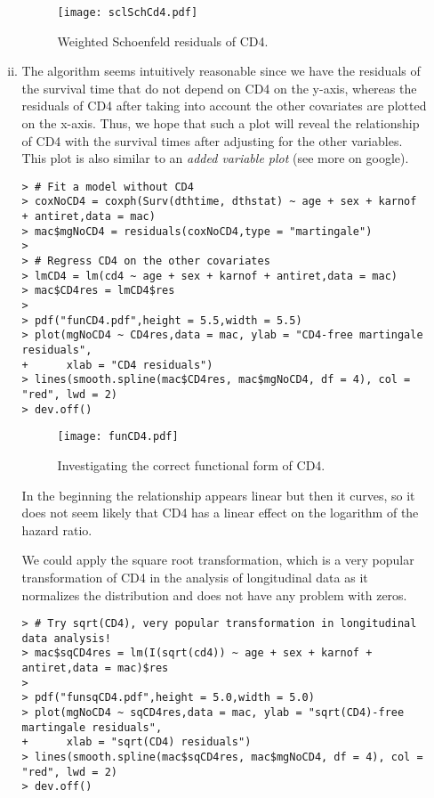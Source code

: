 \begin{enumerate}[(a)]
\begin{enumerate}[(i)]
\begin{figure}
	\centering
		\texttt{[image: sclSchCd4.pdf]}
	\caption{Weighted Schoenfeld residuals of CD4.}
	\label{figure5}
\end{figure}

\item The algorithm seems intuitively reasonable since we have the residuals of the survival time that do not depend on CD4 on the y-axis, whereas the residuals of CD4 after taking into account the other covariates are plotted on the x-axis. Thus, we hope that such a plot will reveal the relationship of CD4 with the survival times after adjusting for the other variables. This plot is also similar to an \emph{added variable plot} (see more on google).
\begin{spacing}{1.2}
\begin{footnotesize}
\begin{verbatim} 
> # Fit a model without CD4
> coxNoCD4 = coxph(Surv(dthtime, dthstat) ~ age + sex + karnof + antiret,data = mac)
> mac$mgNoCD4 = residuals(coxNoCD4,type = "martingale")
> 
> # Regress CD4 on the other covariates
> lmCD4 = lm(cd4 ~ age + sex + karnof + antiret,data = mac)
> mac$CD4res = lmCD4$res
> 
> pdf("funCD4.pdf",height = 5.5,width = 5.5)
> plot(mgNoCD4 ~ CD4res,data = mac, ylab = "CD4-free martingale residuals",
+      xlab = "CD4 residuals")
> lines(smooth.spline(mac$CD4res, mac$mgNoCD4, df = 4), col = "red", lwd = 2)
> dev.off()
\end{verbatim}
\end{footnotesize}
\end{spacing}

\begin{figure}[htbp]
	\centering
		\texttt{[image: funCD4.pdf]}
	\caption{Investigating the correct functional form of CD4.}
	\label{figure6}
\end{figure}
In the beginning the relationship appears linear but then it curves, so it does not seem likely that CD4 has a linear effect on the logarithm of the hazard ratio. 

We could apply the square root transformation, which is a very popular transformation of CD4 in the analysis of longitudinal data as it normalizes the distribution and does not have any problem with zeros. 

\begin{spacing}{1.2}
\begin{footnotesize}
\begin{verbatim} 
> # Try sqrt(CD4), very popular transformation in longitudinal data analysis!
> mac$sqCD4res = lm(I(sqrt(cd4)) ~ age + sex + karnof + antiret,data = mac)$res
> 
> pdf("funsqCD4.pdf",height = 5.0,width = 5.0)
> plot(mgNoCD4 ~ sqCD4res,data = mac, ylab = "sqrt(CD4)-free martingale residuals",
+      xlab = "sqrt(CD4) residuals")
> lines(smooth.spline(mac$sqCD4res, mac$mgNoCD4, df = 4), col = "red", lwd = 2)
> dev.off()
\end{verbatim}
\end{footnotesize}
\end{spacing}


\end{enumerate}
\end{enumerate}
